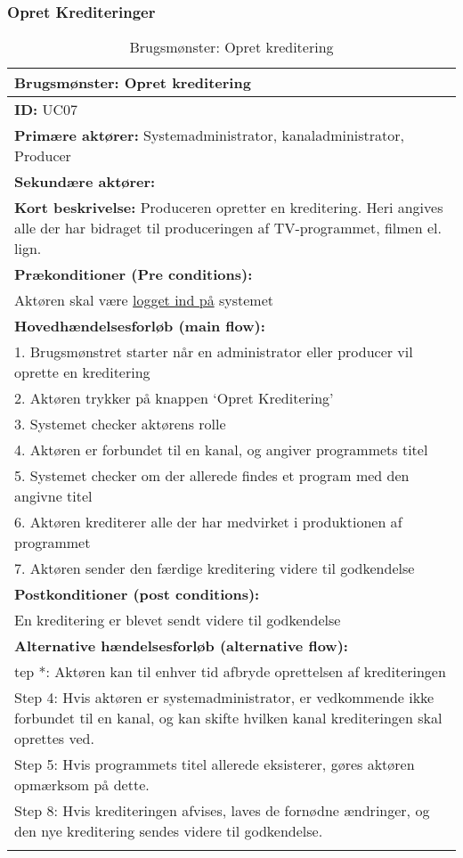  \subsubsection{Opret Krediteringer}
\begin{longtable}[h] {|p{16cm}|}
 \hline
       \textbf{Brugsmønster:} Opret kreditering \\
    \hline
	\textbf{ID:} UC07 \\ \hline
	\textbf{Primære aktører:} Systemadministrator, kanaladministrator, Producer \\ \hline
	\textbf{Sekundære aktører:} \\ \hline
 	\textbf{Kort beskrivelse:} Produceren opretter en kreditering. Heri angives alle der har bidraget til produceringen af TV-programmet, filmen el. lign. \\ \hline
	\textbf{Prækonditioner (Pre conditions):} \\
 Aktøren skal være \hyperref[table:login]{logget ind på} systemet \\ \hline
 \textbf{Hovedhændelsesforløb (main flow):} \\
	1. Brugsmønstret starter når en administrator eller producer vil oprette en kreditering \\
	2. Aktøren trykker på knappen ‘Opret Kreditering’ \\
	3. Systemet checker aktørens rolle \\
	4. Aktøren er forbundet til en kanal, og angiver programmets titel \\
	5. Systemet checker om der allerede findes et program med den angivne titel \\ 
	6. Aktøren krediterer alle der har medvirket i produktionen af programmet \\ 
	7. Aktøren sender den færdige kreditering videre til godkendelse \\ \hline
\textbf{Postkonditioner (post conditions):} \\ 
	En kreditering er blevet sendt videre til godkendelse \\ \hline
	\textbf{Alternative hændelsesforløb (alternative flow):} \\
tep *: Aktøren kan til enhver tid afbryde oprettelsen af krediteringen \\
Step 4: Hvis aktøren er systemadministrator, er vedkommende ikke forbundet til en kanal, og kan skifte hvilken kanal krediteringen skal oprettes ved. \\

Step 5: Hvis programmets titel allerede eksisterer, gøres aktøren opmærksom på dette. \\

Step 8: Hvis krediteringen afvises, laves de fornødne ændringer, og den nye kreditering sendes videre til godkendelse. \\
\hline
\caption{Brugsmønster: Opret kreditering}
\label{tab:create_credits}
\end{longtable}

